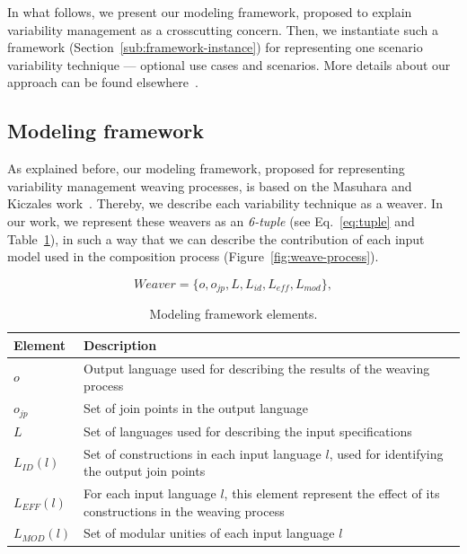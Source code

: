 \documentclass[times, 11pt,twocolumn]{article}
\begin{document}
In what follows, we present our modeling framework, proposed to explain
variability management as a crosscutting concern. Then, we instantiate such a
framework (Section~\ref{sub:framework-instance}) for representing one scenario
variability technique --- optional use cases and scenarios. More details about our approach can be found
elsewhere~\cite{}.

\subsection{Modeling framework}\label{sub:framework}

As explained before, our modeling framework, proposed for representing 
variability management weaving processes, is based on the Masuhara and Kiczales
work~\cite{Masuhara:2003aa}. Thereby, we describe each variability technique
as a weaver. In our work, we represent these weavers as an
\emph{6-tuple} (see Eq.~\ref{eq:tuple} and Table~\ref{tab:tup-01}), in
such a way that we can describe the contribution of each input model used 
in the composition process (Figure~\ref{fig:weave-process}).

\begin{equation}
Weaver = \{o, o_{jp}, L, L_{id}, L_{eff}, L_{mod}\}, 
\label{eq:tuple}
\end{equation}

\begin{table}[bth]
\begin{center}
\caption{Modeling framework elements.} \label{tab:tup-01}
\begin{tabular}{|p{0.6in}|p{2.4in}|}
  \hline
  {\bf Element} & {\bf Description} \\ 
   \hline
  $o$          & Output language used for describing the results of the weaving process \\ \hline
  $o_{jp}$     & Set of join points in the output language \\ \hline
  $L$          & Set of languages used for describing the input specifications \\ \hline
  $L_{ID}(l)$  & Set of constructions in each input language $l$, used for identifying the output join points \\ \hline 
  $L_{EFF}(l)$ & For each input language $l$, this element represent the effect of its constructions in the weaving process \\ \hline
  $L_{MOD}(l)$ & Set of modular unities of each input language $l$\\ \hline
  \hline
\end{tabular}
\end{center}
\end{table}
\end{document}
